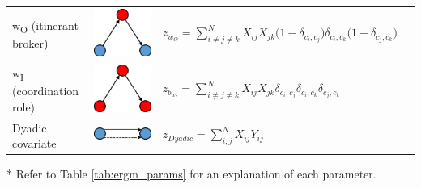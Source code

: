 \begin{table}
{\begin{threeparttable}
\begin{tabular}{l c l l}
w\textsubscript{O} (itinerant broker) & \begin{minipage}{.12\textwidth} \centering \includegraphics[width=0.4\linewidth]{Images/w_O} \end{minipage} & $z_{w_O} = \sum_{i \neq j \neq k}^N X_{ij} X_{jk} \bigg(1 - \delta_{c_i,c_j} \bigg) \delta_{c_i,c_k} \bigg(1 - \delta_{c_j,c_k} \bigg) $ & \\
w\textsubscript{I} (coordination role) & \begin{minipage}{.12\textwidth} \centering \includegraphics[width=0.4\linewidth]{Images/w_I} \end{minipage} & $z_{b_{w_I}} = \sum_{i \neq j \neq k}^N X_{ij} X_{jk} \delta_{c_i,c_j} \delta_{c_i,c_k} \delta_{c_j,c_k}$ & \\
Dyadic covariate & \begin{minipage}{.12\textwidth} \centering \includegraphics[width=0.4\linewidth]{Images/DyadicCovariate} \end{minipage} & $z_{Dyadic} = \sum_{i,j}^N X_{ij} Y_{ij} $ & \\
\bottomrule
\end{tabular}
\begin{tablenotes}
\footnotesize
* Refer to Table \ref{tab:ergm_params} for an explanation of each parameter.
\end{tablenotes}

\end{threeparttable}
}
\end{table}